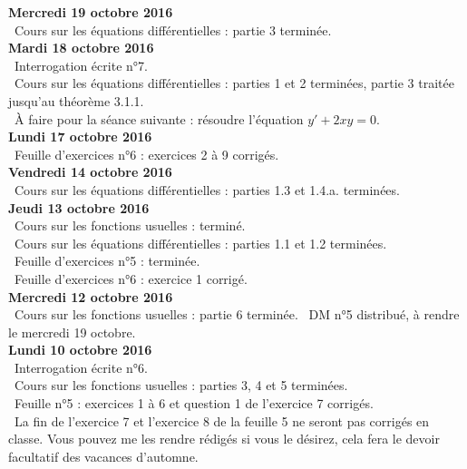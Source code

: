 \documentclass[12pt,a4paper]{article}
\begin{document}
\noindent\textbf{Mercredi 19 octobre 2016}\\
\bu\ Cours sur les équations différentielles : partie 3 terminée. \vspace{.4cm}\\

\noindent\textbf{Mardi 18 octobre 2016}\\
\bu\ Interrogation écrite n°7.\\
\bu\ Cours sur les équations différentielles : parties 1 et 2 terminées, partie 3 traitée jusqu'au théorème 3.1.1.\\
\bu\ À faire pour la séance suivante : résoudre l'équation $y'+2xy=0$. \vspace{.4cm}\\

\noindent\textbf{Lundi 17 octobre 2016}\\
\bu\ Feuille d'exercices n°6 : exercices 2 à 9 corrigés. \vspace{.4cm}\\

\noindent\textbf{Vendredi 14 octobre 2016}\\
\bu\ Cours sur les équations différentielles : parties 1.3 et 1.4.a. terminées. \vspace{.4cm}\\

\noindent\textbf{Jeudi 13 octobre 2016}\\
\bu\ Cours sur les fonctions usuelles : terminé.\\
\bu\ Cours sur les équations différentielles : parties 1.1 et 1.2 terminées. \\
\bu\ Feuille d'exercices n°5 : terminée.\\
\bu\ Feuille d'exercices n°6 : exercice 1 corrigé. \vspace{.4cm}\\

\noindent\textbf{Mercredi 12 octobre 2016}\\
\bu\ Cours sur les fonctions usuelles : partie 6 terminée.\vspace{.4cm}
\bu\ DM n°5 distribué, à rendre le mercredi 19 octobre.\\

\noindent\textbf{Lundi 10 octobre 2016}\\
\bu\ Interrogation écrite n°6.\\
\bu\ Cours sur les fonctions usuelles : parties 3, 4 et 5 terminées.  \\
\bu\ Feuille n°5 : exercices 1 à 6 et question 1 de l'exercice 7 corrigés. \\
\bu\ La fin de l'exercice 7 et l'exercice 8 de la feuille 5 ne seront pas corrigés en classe. Vous pouvez me les rendre rédigés si vous le désirez, cela fera le devoir facultatif des vacances d'automne.\vspace{.4cm}\\
\end{document}

